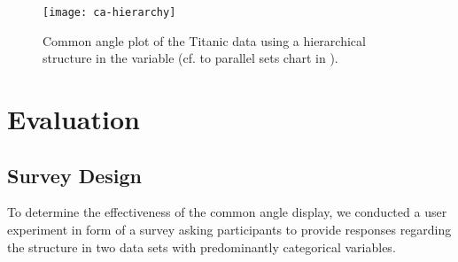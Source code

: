 \begin{figure}[hbtp]
%
%
%
%
%
%
%
%
%
%
%
\texttt{[image: ca-hierarchy]}
\caption{\label{tit-hierarchy} Common angle plot of the Titanic data using a hierarchical structure in the variable (cf. to parallel sets chart in \citep{davies}). }
\end{figure}


\section{Evaluation}
\subsection{Survey Design}
To determine the effectiveness of the common angle display, we conducted a user experiment in form of a survey asking participants to provide responses regarding the structure in two data sets with predominantly categorical variables.

